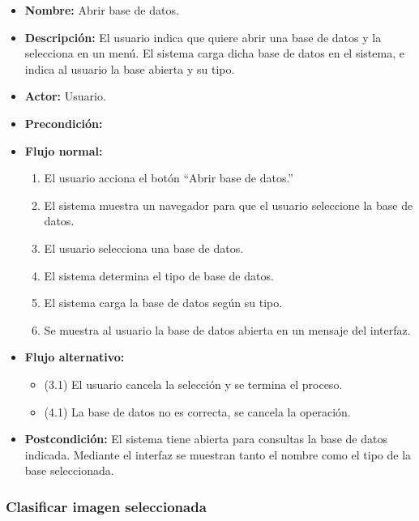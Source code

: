 \begin{itemize}
\item \textbf{Nombre: }Abrir base de datos.
\item \textbf{Descripción: }El usuario indica que quiere abrir una base de datos y la selecciona en un menú. El sistema carga dicha base de datos en el sistema, e indica al usuario la base abierta y su tipo.
\item \textbf{Actor: }Usuario.
\item \textbf{Precondición: }
\item \textbf{Flujo normal: }
\begin{enumerate}
\item El usuario acciona el botón ``Abrir base de datos.''
\item El sistema muestra un navegador para que el usuario seleccione la base de datos.
\item El usuario selecciona una base de datos.
\item El sistema determina el tipo de base de datos.
\item El sistema carga la base de datos según su tipo.
\item Se muestra al usuario la base de datos abierta en un mensaje del interfaz.
\end{enumerate}
\item \textbf{Flujo alternativo:}
\begin{itemize}
\item (3.1) El usuario cancela la selección y se termina el proceso.
\item (4.1) La base de datos no es correcta, se cancela la operación.
\end{itemize}
\item \textbf{Postcondición: } El sistema tiene abierta para consultas la base de datos indicada. Mediante el interfaz se muestran tanto el nombre como el tipo de la base seleccionada.
\end{itemize}

\subsubsection{Clasificar imagen seleccionada}


